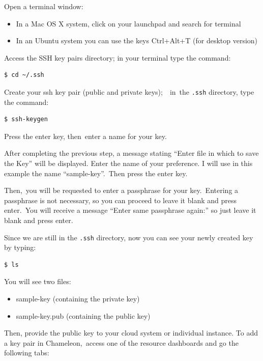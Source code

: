 Open a terminal window:

\begin{itemize}
\tightlist
\item
  In a Mac OS X system, click on your launchpad and search for terminal
\item
  In an Ubuntu system you can use the keys Ctrl+Alt+T (for desktop
  version)
\end{itemize}

Access the SSH key pairs directory; {i}n your terminal type the command:

\begin{verbatim}
$ cd ~/.ssh
\end{verbatim}

Create your ssh key pair (public and private keys);~~in~the
\texttt{.ssh} directory, type the command:

\begin{verbatim}
$ ssh-keygen
\end{verbatim}

Press the enter key, then~enter a name for your key.

After completing the previous step, a message stating ``Enter file in
which to save the Key'' will be displayed. Enter the name of your
preference. I will use in this example the name ``sample-key''.{~}Then
press the enter key.

{Then,~}you will be requested to enter a passphrase for your
key.~Entering a passphrase is not necessary, so you can proceed to leave
it blank and press enter.{~}You will receive a message ``Enter same
passphrase again:'' so just leave it blank and press enter.

Since we are still in the \texttt{.ssh} directory, now you can see your
newly created key by typing:

\begin{verbatim}
$ ls
\end{verbatim}

You will see two files:

\begin{itemize}
\tightlist
\item
  sample-key (containing the private key)
\item
  sample-key.pub (containing the public key)
\end{itemize}

Then, provide the public key to your cloud system or individual
instance. To add a key pair in Chameleon,~access one of the resource
dashboards and go the following tabs:

